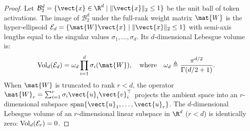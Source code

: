 \begin{proof}
Let $\mathcal{B}_2^d = \{\vect{x} \in \R^d \mid \|\vect{x}\|_2 \le 1\}$ be the unit ball of token activations. The image of $\mathcal{B}_2^d$ under the full-rank weight matrix $\mat{W}$ is the hyper-ellipsoid $\mathcal{E}_d = \{ \mat{W} \vect{x} \mid \|\vect{x}\|_2 \le 1 \}$ with semi-axis lengths equal to the singular values $\sigma_1, \dots, \sigma_d$. Its $d$-dimensional Lebesgue volume is:
\begin{equation}
\Vol_d(\mathcal{E}_d) = \omega_d \prod_{i=1}^d \sigma_i(\mat{W}), \quad \text{where} \quad \omega_d \triangleq \frac{\pi^{d/2}}{\Gamma(d/2 + 1)}.
\end{equation}
When $\mat{W}$ is truncated to rank $r < d$, the operator $\mat{W}_r = \sum_{i=1}^r \sigma_i \vect{u}_i \vect{v}_i^\top$ projects the ambient space into an $r$-dimensional subspace $\operatorname{span}\{\vect{u}_1, \dots, \vect{u}_r\}$. The $d$-dimensional Lebesgue volume of an $r$-dimensional linear subspace in $\R^d$ ($r < d$) is identically zero: $\operatorname{Vol}_d(\mathcal{E}_r) = 0$.


\end{proof}
